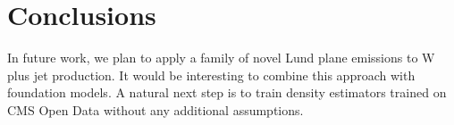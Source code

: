 \section{Conclusions}\label{sec:conclusions}

In future work, we plan to apply a family of novel Lund plane emissions
to W plus jet production. It would be interesting to combine this
approach with foundation models. A natural next step is to train density
estimators trained on CMS Open Data without any additional assumptions.

